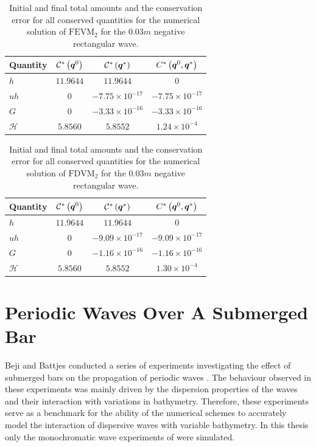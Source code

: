 \begin{table}
	\centering
	\begin{tabular}{l  c  c c}
		Quantity& $\mathcal{C}^*\left(\boldsymbol{q}^0\right)$ & $\mathcal{C}^*\left(\boldsymbol{q}^*\right)$ & ${C}^*\left(\boldsymbol{q}^0,\boldsymbol{q}^*\right)$ \B \\
		\hline 
		$h$ & $11.9644$ & $11.9644$ & $0$ \T\\
		$uh$ & $0$ & $-7.75 \times 10^{-17}$ & $-7.75\times 10^{-17}$\\
		$G$ & $0$ & $-3.33\times 10^{-16}$ & $-3.33\times 10^{-16}$\\
		$\mathcal{H}$ & $5.8560$ & $5.8552$ & $1.24 \times 10^{-4}$  \B \\
		\hline
	\end{tabular}
	\caption{Initial and final total amounts and the conservation error for all conserved quantities for the numerical solution of $\text{FEVM}_2$ for the $0.03m$ negative rectangular wave.}
	\label{tab:ConservationSegurFEVM3cm}
\end{table} 
\begin{table}
	\centering
	\begin{tabular}{l  c  c c}
		Quantity& $\mathcal{C}^*\left(\boldsymbol{q}^0\right)$ & $\mathcal{C}^*\left(\boldsymbol{q}^*\right)$ & ${C}^*\left(\boldsymbol{q}^0,\boldsymbol{q}^*\right)$ \B \\
		\hline
		$h$ & $11.9644$ & $11.9644$ & $0$ \T\\
		$uh$ & $0$ & $-9.09 \times 10^{-17}$ & $-9.09 \times 10^{-17}$\\
		$G$ & $0$ & $-1.16\times 10^{-16}$ & $-1.16\times 10^{-16}$\\
		$\mathcal{H}$ & $5.8560$ & $5.8552$ & $1.30 \times 10^{-4}$ \B\\
		\hline
	\end{tabular}
	\caption{Initial and final total amounts and the conservation error for all conserved quantities for the numerical solution of $\text{FDVM}_2$ for the $0.03m$ negative rectangular wave.}
	\label{tab:ConservationSegurFDVM3cm}
\end{table}  

\section{Periodic Waves Over A Submerged Bar}
\label{sec:PeriodicWavessubBar}
Beji and Battjes conducted a series of experiments investigating the effect of submerged bars on the propagation of periodic waves \cite{Beji-Battjes-1993-151,Beji-Battjes-1994-1}. The behaviour observed in these experiments was mainly driven by the dispersion properties of the waves and their interaction with variations in bathymetry. Therefore, these experiments serve as a benchmark for the ability of the numerical schemes to accurately model the interaction of dispersive waves with variable bathymetry. In this thesis only the monochromatic wave experiments of \citet{Beji-Battjes-1994-1} were simulated.

